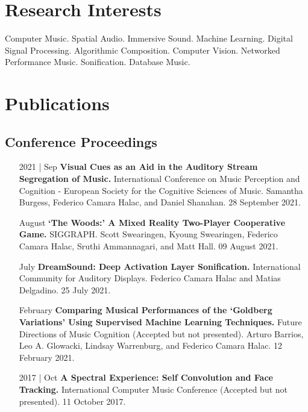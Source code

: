 \documentclass[12pt,overlapped]{res}%
\begin{document}
\begin{resume}
\section{Research Interests}%
\label{sec:ResearchInterests}%
Computer Music. %
Spatial Audio. %
Immersive Sound. %
Machine Learning. %
Digital Signal Processing. %
Algorithmic Composition. %
Computer Vision. %
Networked Performance Music. %
Sonification. %
Database Music. 

%
\pagebreak


\section{Publications}%
\label{sec:Publications}%
\subsection{Conference Proceedings}%
\fullline%
\begin{itemize}[align=parleft,leftmargin=2.25cm,labelwidth=2cm]
\item[2021 | Sep]
\textbf{Visual Cues as an Aid in the Auditory Stream Segregation of Music.}
International Conference on Music Perception and Cognition {-} European Society for the Cognitive Sciences of Music. 
Samantha Burgess, Federico Camara Halac, and Daniel Shanahan. 
28 September 2021.
\end{itemize}%
\begin{itemize}[align=parleft,leftmargin=2.25cm,labelwidth=2cm]
\item[August]
\textbf{`The Woods:' A Mixed Reality Two{-}Player Cooperative Game.}
SIGGRAPH. 
Scott Swearingen, Kyoung Swearingen, Federico Camara Halac, Sruthi Ammannagari, and Matt Hall. 
09 August 2021.
\end{itemize}%
\begin{itemize}[align=parleft,leftmargin=2.25cm,labelwidth=2cm]
\item[July]
\textbf{DreamSound: Deep Activation Layer Sonification.}
International Community for Auditory Displays. 
Federico Camara Halac and Matias Delgadino. 
25 July 2021.
\end{itemize}%
\begin{itemize}[align=parleft,leftmargin=2.25cm,labelwidth=2cm]
\item[February]
\textbf{Comparing Musical Performances of the `Goldberg Variations' Using Supervised Machine Learning Techniques.}
Future Directions of Music Cognition (Accepted but not presented). 
Arturo Barrios, Leo A. Glowacki, Lindsay Warrenburg, and Federico Camara Halac. 
12 February 2021.
\end{itemize}%
\begin{itemize}[align=parleft,leftmargin=2.25cm,labelwidth=2cm]
\item[2017 | Oct]
\textbf{A Spectral Experience: Self Convolution and Face Tracking.}
International Computer Music Conference (Accepted but not presented). 
11 October 2017.
\end{itemize}%

\end{resume}
\end{document}
